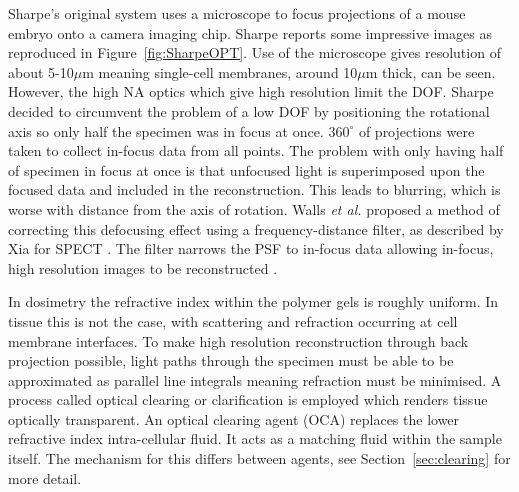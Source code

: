 Sharpe's original system uses a microscope to focus projections of a mouse embryo onto a camera imaging chip.  Sharpe reports some impressive images as reproduced in Figure~\ref{fig:SharpeOPT}. Use of the microscope gives resolution of about 5-10$\mu$m meaning single-cell membranes, around 10$\mu$m thick, can be seen\cite{Sharpe:2002jp}. However, the high NA  optics which give high resolution limit the DOF. Sharpe decided to circumvent the problem of a low DOF by positioning the rotational axis so only half the specimen was in focus at once. $360^{\circ}$ of projections were taken to collect in-focus data from all points. The problem with only having half of specimen in focus at once is that unfocused light is superimposed upon the focused data and included in the reconstruction. This leads to blurring, which is worse with distance from the axis of rotation. Walls \textit{et al.} proposed a method of correcting this defocusing effect using a frequency-distance filter, as described by Xia for SPECT \cite{xia1995fourier,Walls:2007jl}. The filter narrows the PSF to in-focus data allowing in-focus, high resolution images to be reconstructed \cite{Walls:2007jl}.

	
	
In dosimetry the refractive index within the polymer gels is roughly uniform. In tissue this is not the case, with scattering and refraction occurring at cell membrane interfaces. To make high resolution reconstruction through back projection possible, light paths through the specimen must be able to  be approximated as parallel line integrals meaning refraction must be minimised. A process called optical clearing or clarification is employed which renders tissue optically transparent. An optical clearing agent (OCA) replaces the lower refractive index intra-cellular fluid. It acts as a matching fluid within the sample itself. The mechanism for this differs between agents, see Section~\ref{sec:clearing} for more detail. 





